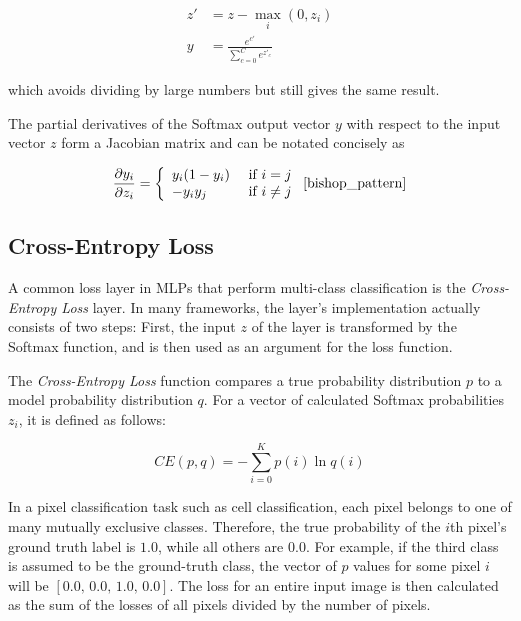\begin {align}
	z' &= z - \max \limits_{i}(0, z_i)\\
	y &= \frac{e^{c'}}{\sum_{c=0}^{C} e^{z'_{{c}}}}
\end {align}

\noindent which avoids dividing by large numbers but still gives the same result. \cite[p. 81]{deeplearning_book}

The partial derivatives of the Softmax output vector $y$ with respect to the input vector $z$ form a Jacobian matrix and can be notated concisely as

\begin {align}
	\frac{\partial y_i}{\partial z_i} = \bigg \{ \begin {array}{ll}
								y_i(1 - y_i)& \text{ if } i = j \\
								-y_i y_j& \text{ if } i \neq j
							\end{array}
	\label{eq:softmax_deriv}\,\,\cite[\text{ p. 209}]{bishop_pattern}
\end {align}


		\subsection{Cross-Entropy Loss}
\label{subsec:cross_ent}

A common loss layer in MLPs that perform multi-class classification is the \textit{Cross-Entropy Loss} layer. In many frameworks, the layer's implementation actually consists of two steps: First, the input $z$ of the layer is transformed by the Softmax function, and is then used as an argument for the loss function.

The \textit{Cross-Entropy Loss} function compares a true probability distribution $p$ to a model probability distribution $q$. For a vector of calculated Softmax probabilities $z_i$, it is defined as follows:

\[CE(p, q) = -\sum \limits_{i = 0}^{K} p(i) \ln q(i)\]

\noindent In a pixel classification task such as cell classification, each pixel belongs to one of many mutually exclusive classes. Therefore, the true probability of the $i$th pixel's ground truth label is $1.0$, while all others are $0.0$. For example, if the third class is assumed to be the ground-truth class, the vector of $p$ values for some pixel $i$ will be $[0.0,\, 0.0,\, 1.0,\, 0.0]$. The loss for an entire input image is then calculated as the sum of the losses of all pixels divided by the number of pixels.\\

